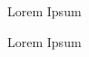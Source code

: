 \documentclass{book}
\begin{document}
\begin{RPGComment}{Lorem Ipsum}
    \lipsum[1]
\end{RPGComment}

\begin{RPGComment}[color=blue!25]{Lorem Ipsum}
    \lipsum[2]
\end{RPGComment}
\end{document}

